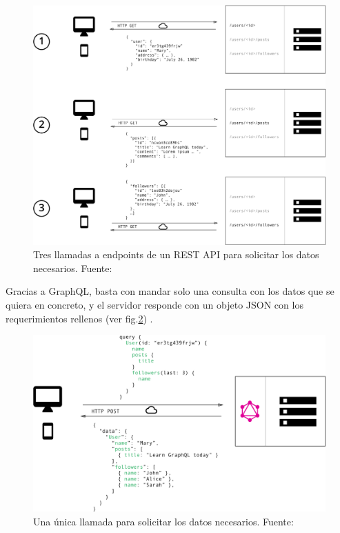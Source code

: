 \begin{figure}[ht!]
    \centering
    \includegraphics[width=12cm]{imagenes/herramientas/rest-query}
    \caption{Tres llamadas a endpoints de un REST API para solicitar los datos necesarios. Fuente: 
    \cite{graphql-vs-rest}}
    \label{fig:consulta-rest}
\end{figure}

\vspace{5mm}

\noindent Gracias a GraphQL, basta con mandar solo una consulta con los datos que se quiera en concreto, y el 
servidor responde con un objeto JSON con los requerimientos rellenos (ver fig.\ref{fig:consulta-graphql}) 
\cite{graphql-vs-rest}.

\vspace{5mm}

\begin{figure}[ht!]
    \centering
    \includegraphics[width=12cm]{imagenes/herramientas/graphql-query}
    \caption{Una única llamada para solicitar los datos necesarios. Fuente: \cite{graphql-vs-rest}}
    \label{fig:consulta-graphql}
\end{figure}

